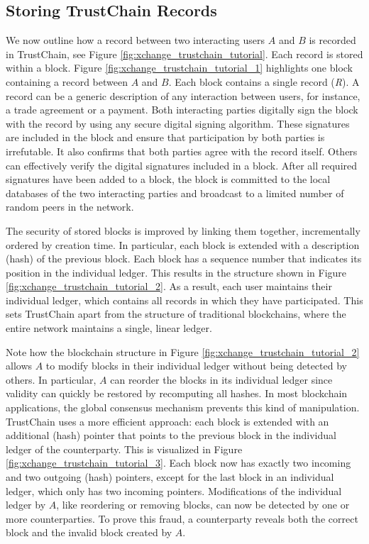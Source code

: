 \subsection{Storing TrustChain Records}
We now outline how a record between two interacting users $ A $ and $ B $ is recorded in TrustChain, see Figure \ref{fig:xchange_trustchain_tutorial}.
Each record is stored within a block.
Figure \ref{fig:xchange_trustchain_tutorial_1} highlights one block containing a record between $ A $ and $ B $.
Each block contains a single record (\emph{R}).
A record can be a generic description of any interaction between users, for instance, a trade agreement or a payment.
Both interacting parties digitally sign the block with the record by using any secure digital signing algorithm.
These signatures are included in the block and ensure that participation by both parties is irrefutable.
It also confirms that both parties agree with the record itself.
Others can effectively verify the digital signatures included in a block.
After all required signatures have been added to a block, the block is committed to the local databases of the two interacting parties and broadcast to a limited number of random peers in the network.

The security of stored blocks is improved by linking them together, incrementally ordered by creation time.
In particular, each block is extended with a description (hash) of the previous block.
Each block has a sequence number that indicates its position in the individual ledger.
This results in the structure shown in Figure \ref{fig:xchange_trustchain_tutorial_2}.
As a result, each user maintains their individual ledger, which contains all records in which they have participated.
This sets TrustChain apart from the structure of traditional blockchains, where the entire network maintains a single, linear ledger.

Note how the blockchain structure in Figure \ref{fig:xchange_trustchain_tutorial_2} allows $ A $ to modify blocks in their individual ledger without being detected by others.
In particular, $ A $ can reorder the blocks in its individual ledger since validity can quickly be restored by recomputing all hashes.
In most blockchain applications, the global consensus mechanism prevents this kind of manipulation.
TrustChain uses a more efficient approach: each block is extended with an additional (hash) pointer that points to the previous block in the individual ledger of the counterparty.
This is visualized in Figure \ref{fig:xchange_trustchain_tutorial_3}.
Each block now has exactly two incoming and two outgoing (hash) pointers, except for the last block in an individual ledger, which only has two incoming pointers.
Modifications of the individual ledger by $ A $, like reordering or removing blocks, can now be detected by one or more counterparties.
To prove this fraud, a counterparty reveals both the correct block and the invalid block created by $ A $.

